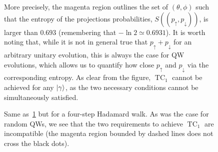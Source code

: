 \documentclass[
	aps, pra,
	superscriptaddress, twocolumn,
	floatfix,
	10pt
]{revtex4-1}
\newcommand{\on}[1]{\operatorname{#1}}
\begin{document}
\begin{figure}[tb]
{    More precisely, the magenta region outlines the set of $(\theta,\phi)$ such that the entropy of the projections probabilities, $S((p_\uparrow, p_\downarrow))$, is larger than $0.693$ (remembering that $-\ln2\simeq 0.6931$).
    It is worth noting that, while it is not in general true that $p_\uparrow+p_\downarrow$ for an arbitrary unitary evolution, this is always the case for QW evolutions, which allows us to quantify how close $p_\uparrow$ and $p_\downarrow$ via the corresponding entropy.
    As clear from the figure, $\on{TC}_1$ cannot be achieved for any $\ket\gamma$, as the two necessary conditions cannot be simultaneously satisfied.
    }
    \label{fig:contourPlot_overlapAndEntropies_rnd4steps}
\end{figure}

\begin{figure}[tb]
    \centering
    \caption{Same as~\cref{fig:contourPlot_overlapAndEntropies_rnd4steps} but for a four-step Hadamard walk.
    As was the case for random QWs, we see that the two requirements to achieve $\on{TC}_1$ are incompatible (the magenta region bounded by dashed lines does not cross the black dots).
    }
    \label{fig:contourPlot_overlapAndEntropies_Hadamard4steps}
\end{figure}
\end{document}
